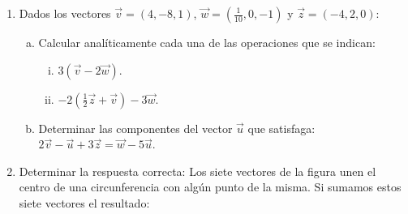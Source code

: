 \documentclass[11pt]{article}
\begin{document}
\begin{enumerate}[\hspace{-3mm}$1)$]
\item  Dados los vectores $\vec{v} = (4, -8, 1)$, $\vec{w} = \left(\frac{1}{10}, 0, -1\right)$ y $\vec{z} = (-4, 2, 0)$:

    \begin{enumerate}[a)]
        \item Calcular analíticamente cada una de las operaciones que se indican:
            \begin{enumerate}[i)]
                \item $3(\vec{v} - 2\vec{w})$.
                \item $-2\left(\frac{1}{2}\vec{z} + \vec{v}\right) - 3\vec{w}$.
            \end{enumerate}
        \item Determinar las componentes del vector $\vec{u}$ que satisfaga: $2\vec{v} - \vec{u} + 3\vec{z} = \vec{w} - 5\vec{u}$.
    \end{enumerate}
















\item Determinar la respuesta correcta: Los siete vectores de la figura unen el centro de una circunferencia con algún punto de la misma. Si sumamos estos siete vectores el resultado:




\begin{minipage}{.6\textwidth}
\begin{center}
\end{center}
\end{minipage}
\end{enumerate}
\end{document}
